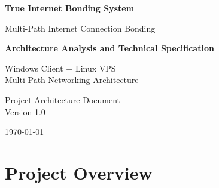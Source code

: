 \documentclass[12pt,a4paper]{article}
\begin{document}

\begin{titlepage}
    \centering

    \vspace*{2cm}

    {\Huge\bfseries True Internet Bonding System\par}

    \vspace{0.5cm}

    {\Large Multi-Path Internet Connection Bonding\par}

    \vspace{1.5cm}

    \begin{tcolorbox}[
        colback=lightblue,
        colframe=darkblue,
        width=0.9\textwidth
    ]
    \centering
    \textbf{Architecture Analysis and Technical Specification}
    \end{tcolorbox}

    \vspace{2cm}

    {\large
    Windows Client + Linux VPS\\
    Multi-Path Networking Architecture
    \par}

    \vfill

    {\large
    Project Architecture Document\\
    Version 1.0
    \par}

    \vspace{1cm}

    {\today}

\end{titlepage}


\tableofcontents
\newpage


\section{Project Overview}
\end{document}

